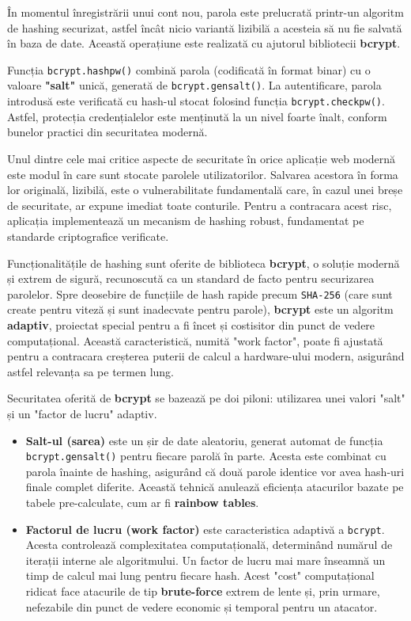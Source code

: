 \documentclass[12pt, a4paper, oneside, romanian]{teza-upb}
\begin{document}
În momentul înregistrării unui cont nou, parola este prelucrată printr-un algoritm de hashing securizat, astfel încât nicio variantă lizibilă a acesteia să nu fie salvată în baza de date. Această operațiune este realizată cu ajutorul bibliotecii \textbf{bcrypt}.

 Funcția \texttt{bcrypt.hashpw()} combină parola (codificată în format binar) cu o valoare \textbf{"salt"} unică, generată de \texttt{bcrypt.gensalt()}. La autentificare, parola introdusă este verificată cu hash-ul stocat folosind funcția \texttt{bcrypt.checkpw()}. Astfel, protecția credențialelor este menținută la un nivel foarte înalt, conform bunelor practici din securitatea modernă.


Unul dintre cele mai critice aspecte de securitate în orice aplicație web modernă este modul în care sunt stocate parolele utilizatorilor. Salvarea acestora în forma lor originală, lizibilă, este o vulnerabilitate fundamentală care, în cazul unei breșe de securitate, ar expune imediat toate conturile. Pentru a contracara acest risc, aplicația implementează un mecanism de hashing robust, fundamentat pe standarde criptografice verificate.

Funcționalitățile de hashing sunt oferite de biblioteca \textbf{bcrypt}, o soluție modernă și extrem de sigură, recunoscută ca un standard de facto pentru securizarea parolelor. Spre deosebire de funcțiile de hash rapide precum \texttt{SHA-256} (care sunt create pentru viteză și sunt inadecvate pentru parole), \textbf{bcrypt} este un algoritm \textbf{adaptiv}, proiectat special pentru a fi încet și costisitor din punct de vedere computațional. Această caracteristică, numită "work factor", poate fi ajustată pentru a contracara creșterea puterii de calcul a hardware-ului modern, asigurând astfel relevanța sa pe termen lung.

Securitatea oferită de \textbf{bcrypt} se bazează pe doi piloni: utilizarea unei valori "salt" și un "factor de lucru" adaptiv.
\begin{itemize}
	\item \textbf{Salt-ul (sarea)} este un șir de date aleatoriu, generat automat de funcția \texttt{bcrypt.gensalt()} pentru fiecare parolă în parte. Acesta este combinat cu parola înainte de hashing, asigurând că două parole identice vor avea hash-uri finale complet diferite. Această tehnică anulează eficiența atacurilor bazate pe tabele pre-calculate, cum ar fi \textbf{rainbow tables}.
	
	\item \textbf{Factorul de lucru (work factor)} este caracteristica adaptivă a \texttt{bcrypt}. Acesta controlează complexitatea computațională, determinând numărul de iterații interne ale algoritmului. Un factor de lucru mai mare înseamnă un timp de calcul mai lung pentru fiecare hash. Acest "cost" computațional ridicat face atacurile de tip \textbf{brute-force} extrem de lente și, prin urmare, nefezabile din punct de vedere economic și temporal pentru un atacator.
\end{itemize}
\end{document}
